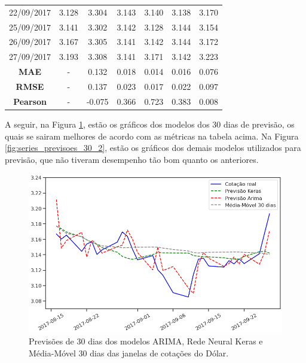 \begin{longtable}{|c|c|c|c|c|c|c|}
22/09/2017 & 3.128 & 3.304 & 3.143 & 3.140 & 3.138 & 3.170 \\
25/09/2017 & 3.141 & 3.302 & 3.142 & 3.128 & 3.144 & 3.154 \\
26/09/2017 & 3.167 & 3.305 & 3.141 & 3.142 & 3.144 & 3.172 \\
27/09/2017 & 3.193 & 3.308 & 3.141 & 3.171 & 3.142 & 3.223 \\
\hline
\hline
\textbf{MAE} & - & 0.132 & 0.018 & 0.014 & 0.016 & 0.076 \\
\textbf{RMSE} & - & 0.137 & 0.023 & 0.017 & 0.022 & 0.097 \\
\textbf{Pearson} & - & -0.075 & 0.366 & 0.723 & 0.383 & 0.008 \\

\end{longtable}
\normalsize

A seguir, na Figura \ref{fig:series_previsoes_30_1}, estão os gráficos dos modelos dos $30$ dias de previsão, os quais se sairam melhores de acordo com as métricas na tabela acima. Na Figura \ref{fig:series_previsoes_30_2}, estão os gráficos dos demais modelos utilizados para previsão, que não tiveram desempenho tão bom quanto os anteriores.

\begin{figure}[htb]
\centering
\includegraphics[width=14cm]{figuras/series_previsoes_30_1}
\caption{Previsões de $30$ dias dos modelos ARIMA, Rede Neural Keras e Média-Móvel $30$ dias das janelas de cotações do Dólar.}
\label{fig:series_previsoes_30_1}
\end{figure}

